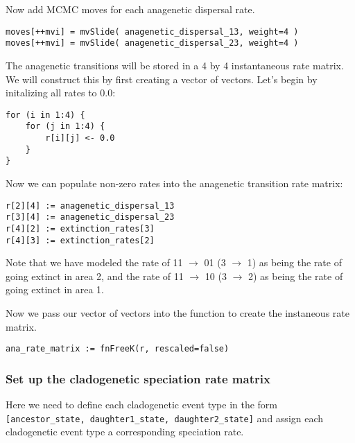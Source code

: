 Now add MCMC moves for each anagenetic dispersal rate.
{\tt \begin{snugshade*}
\begin{lstlisting}
moves[++mvi] = mvSlide( anagenetic_dispersal_13, weight=4 )
moves[++mvi] = mvSlide( anagenetic_dispersal_23, weight=4 )
\end{lstlisting}
\end{snugshade*}}

The anagenetic transitions will be stored in a 4 by 4
instantaneous rate matrix. We will construct this by
first creating a vector of vectors. Let's begin by 
initalizing all rates to 0.0:
{\tt \begin{snugshade*}
\begin{lstlisting}
for (i in 1:4) {
    for (j in 1:4) {
        r[i][j] <- 0.0
    }
}
\end{lstlisting}
\end{snugshade*}}

Now we can populate non-zero rates into the anagenetic transition rate matrix:
{\tt \begin{snugshade*}
\begin{lstlisting}
r[2][4] := anagenetic_dispersal_13
r[3][4] := anagenetic_dispersal_23
r[4][2] := extinction_rates[3]
r[4][3] := extinction_rates[2]
\end{lstlisting}
\end{snugshade*}}
Note that we have modeled the rate of 11 $\rightarrow$ 01 (3 $\rightarrow$ 1) as being
the rate of going extinct in area 2, and the rate of 11 $\rightarrow$ 10 (3 $\rightarrow$ 2) 
as being the rate of going extinct in area 1. 

Now we pass our vector of vectors into the  function to create
the instaneous rate matrix.
{\tt \begin{snugshade*}
\begin{lstlisting}
ana_rate_matrix := fnFreeK(r, rescaled=false)
\end{lstlisting}
\end{snugshade*}}

\subsubsection{Set up the cladogenetic speciation rate matrix}

Here we need to define each cladogenetic event type in the form
\texttt{[ancestor\_state, daughter1\_state, daughter2\_state]}
and assign each cladogenetic event type a corresponding 
speciation rate.

